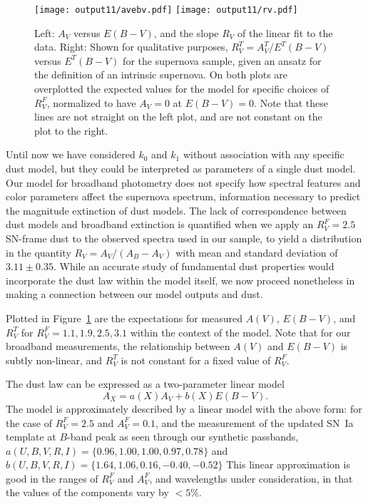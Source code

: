 \documentclass{aastex61}   	%
\begin{document}
\begin{figure}[htbp] %
   \centering
   \texttt{[image: output11/avebv.pdf]}
   \texttt{[image: output11/rv.pdf]}
   \caption{
	\color{red}
   Left: $A_V$ versus $E(B-V)$, and the slope $R_V$ of the linear fit to the data. Right: Shown for qualitative purposes,
   $R^T_V=A^T_V/E^T(B-V)$ 
   versus $E^T(B-V)$ for the supernova sample, given an ansatz for the definition of an intrinsic supernova. 
   On both plots are overplotted the expected values for the  model
   for specific choices of $R^F_V$, normalized to have $A_V=0$ at $E(B-V)=0$.  Note that these lines are not straight on the left plot, and are not constant on the plot to the right.
   \color{black}
   \label{avebv:fig}}
\end{figure}


Until now we have considered $k_0$ and $k_1$ without association with any specific dust model, but they could be interpreted as
parameters of a single  dust model.
\color{red}
Our model for broadband photometry does not specify how spectral features and color parameters affect the supernova spectrum, information
necessary to predict the magnitude extinction of dust models.
\color{blue}
The lack of correspondence between dust models and broadband extinction is quantified when we apply an $R^F_V=2.5$ SN-frame dust to the
observed spectra used in our sample, to yield a distribution in the quantity $R_V=A_V/(A_B-A_V)$ with mean and standard deviation of $3.11 \pm 0.35$.
While an accurate study of fundamental dust properties would incorporate the dust law within the model itself, we now proceed nonetheless
in making a connection between our model outputs and dust.

\color{red}
Plotted in Figure~\ref{avebv:fig} are the expectations for measured $A(V)$, $E(B-V)$, and $R^T_V$ for $R^F_V=1.1, 1.9, 2.5, 3.1$
within the context of the  model.
Note that for our broadband measurements, the relationship between $A(V)$ and $E(B-V)$ is subtly
non-linear, and $R^T_V$ is not constant for a fixed value of $R^F_V$.
\color{black}

The \citet{1989ApJ...345..245C} dust law can be expressed as a two-parameter linear model
\begin{equation}
A_X = a(X)  A_V + b(X) E(B-V).
\end{equation}
The  model is approximately described by a linear model with
the above form:
\color{red}
for the case of
$R^F_V=2.5$ and $A^F_V=0.1$,
and the measurement of the updated
\citet{2007ApJ...663.1187H} SN~Ia template at $B$-band peak as seen through our synthetic passbands,
$a(U,B,V,R,I)=\{0.96,   1.00,   1.00,   0.97,   0.78\}$ and $b(U,B,V,R,I)=\{  1.64,   1.06,   0.16,  -0.40,  -0.52\}$ 
\color{black}
This linear approximation
is good in the ranges of
\color{red}
 $R^F_V$ and $A^F_V$,
\color{black}
and wavelengths under consideration, in that the values of the components  vary by $<5$\%.
\end{document}
